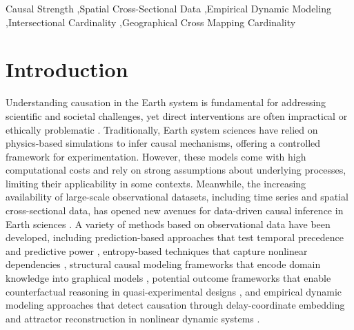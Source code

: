 \documentclass[authoryear,preprint,review,12pt]{elsarticle}
\begin{document}
\begin{frontmatter}
\begin{abstract}
\end{abstract}

\begin{keyword}
Causal Strength \sep Spatial Cross-Sectional Data \sep Empirical Dynamic Modeling \sep Intersectional Cardinality \sep Geographical Cross Mapping Cardinality
\end{keyword}

\end{frontmatter}

\linenumbers


\section{Introduction}

Understanding causation in the Earth system is fundamental for addressing scientific and societal challenges, yet direct interventions are often impractical or ethically problematic \citep{gao2022tscess,runge2023tsc,gao2023gccm}. Traditionally, Earth system sciences have relied on physics-based simulations to infer causal mechanisms, offering a controlled framework for experimentation. However, these models come with high computational costs and rely on strong assumptions about underlying processes, limiting their applicability in some contexts. Meanwhile, the increasing availability of large-scale observational datasets, including time series and spatial cross-sectional data, has opened new avenues for data-driven causal inference in Earth sciences \citep{runge2019esstsc,runge2023tsc}. A variety of methods based on observational data have been developed, including prediction-based approaches that test temporal precedence and predictive power \citep{granger1969grangertest,geweke1982grangertest2}, entropy-based techniques that capture nonlinear dependencies \citep{schreiber2000te1,vicente2010te2,sun2014ce1}, structural causal modeling frameworks that encode domain knowledge into graphical models \citep{pearl2000scm2,pearl2009scm3,pearl2018scm4}, potential outcome frameworks that enable counterfactual reasoning in quasi-experimental designs \citep{rubin1974pom1,rubin1986pom2,rubin2005pom3}, and empirical dynamic modeling approaches that detect causation through delay-coordinate embedding and attractor reconstruction in nonlinear dynamic systems \citep{sugihara2012ccm,ma2014cms,clark2015multispatialccm}.
\end{document}
